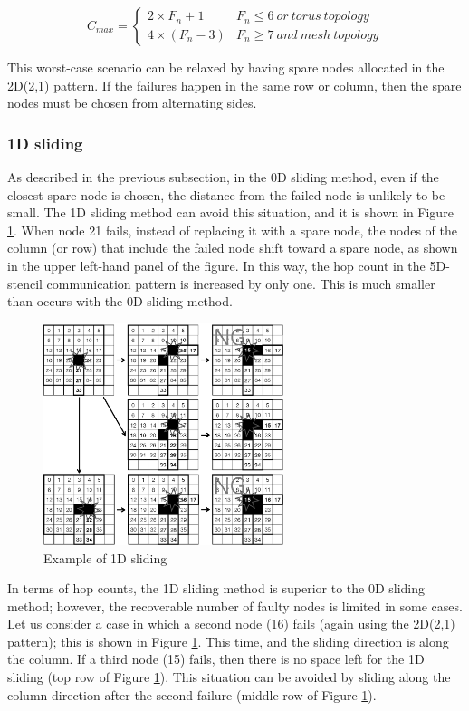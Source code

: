 \documentclass[Afour,times,sageh]{sagej}
\begin{document}
\begin{equation}
C_{max} = \left \{ \begin{array}{ll}
2 \times F_n + 1 & F_n \leq 6~or~torus~topology \\
4 \times ( F_n - 3 ) & F_n \geq 7~and~mesh~topology
\end{array}\nonumber
\right.
\end{equation}

This worst-case scenario can be relaxed by having spare nodes
allocated in the 2D(2,1) pattern. If the failures happen in the same
row or column, then the spare nodes must be chosen from alternating
sides.

\subsubsection{1D sliding}

As described in the previous subsection, in the 0D sliding method,
even if the closest spare node is chosen, the distance from the failed
node is unlikely to be small. The 1D sliding method can avoid this
situation, and it is shown in Figure \ref{fig:1d-sliding}. When node
21 fails, instead of replacing it with a spare node, the nodes of the
column (or row) that include the failed node shift toward a
spare node, as shown in the upper left-hand panel of the figure. In
this way, the hop count in the 5D-stencil communication pattern is
increased by only one. This is much smaller than occurs with the 0D
sliding method.

\begin{figure}[ht]
\centering
\includegraphics[width=70mm]{Figs/1D-Sliding.eps}
  \caption{Example of 1D sliding}
  \label{fig:1d-sliding}
\end{figure}

In terms of hop counts, the 1D sliding method is superior to the
0D sliding method; however, the recoverable number of faulty nodes is
limited in some cases. Let us consider a case in which a second node
(16) fails (again using the 2D(2,1) pattern); this is shown in Figure
\ref{fig:1d-sliding}. This time, and the sliding direction is along
the column. If a third node (15) fails, then there is no space left
for the 1D sliding (top row of Figure \ref{fig:1d-sliding}). This
situation can be avoided by sliding along the column direction after
the second failure (middle row of Figure \ref{fig:1d-sliding}).
\end{document}
